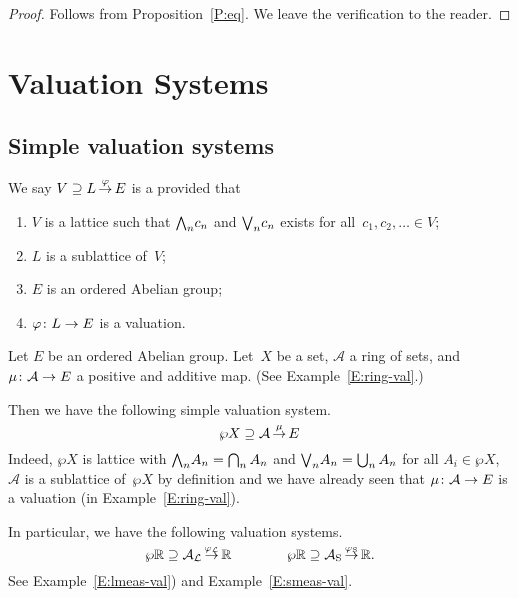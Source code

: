 \documentclass[main.tex]{subfiles}
\begin{document}
\begin{proof}
Follows from Proposition~\ref{P:eq}.
We leave the verification to the reader.
\end{proof}

\section{Valuation Systems}
\label{S:valuation-systems}
\subsection{Simple valuation systems}
%
%
\begin{dfn}
\label{D:simple-system}
We say $V \supseteq L\,\smash{\stackrel{\varphi}{\rightarrow}}\,E$
 is a 
provided that
\begin{enumerate}
\item \label{D:simple-system-1}
$V$ is a lattice
such that $\textstyle{\bigwedge}_n c_n$ and $\textstyle{\bigvee}_n c_n$ exists for all~$c_1,c_2,\dotsc\in V$;
\item \label{D:simple-system-2}
$L$ is a sublattice of~$V$;
\item \label{D:simple-system-3}
$E$ is an ordered Abelian group;
\item \label{D:simple-system-4}
$\varphi\colon L\rightarrow E$ is a valuation.
\end{enumerate}
\end{dfn}

%
%
\begin{ex}
\label{E:ring-system}
Let $E$ be an ordered Abelian group.
Let~$X$ be a set, 
$\mathcal{A}$ a ring of sets,
and $\mu\colon \mathcal{A}\rightarrow E$
a positive and additive map.
(See Example~\ref{E:ring-val}.)

Then we have the following simple valuation system.
\begin{equation*}
\wp X \supseteq \mathcal{A}\,\smash{\stackrel{\mu}{\rightarrow}}\,E
\end{equation*}
Indeed, $\wp X$ is lattice with 
$\textstyle{\bigwedge}_n A_n = \bigcap_n A_n$
and $\textstyle{\bigvee}_n A_n = \bigcup_n A_n$ for all $A_i \in \wp X$,
$\mathcal{A}$ is a sublattice of~$\wp X$
by definition
and we have already seen 
that $\mu\colon \mathcal{A}\rightarrow E$ is a valuation
(in Example~\ref{E:ring-val}).

In particular,
we have the following valuation systems.
\begin{equation*}
\wp{\mathbb{R}} \supseteq \mathcal{A}_{\mathcal{L}}\,\smash{\stackrel{\varphi_{\mathcal{L}}}{\rightarrow}}\,\mathbb{R} \qquad\qquad \wp{\mathbb{R}} \supseteq \mathcal{A}_{\mathrm{S}}\,\smash{\stackrel{\varphi_{\mathrm{S}}}{\rightarrow}}\,\mathbb{R}.
\end{equation*}
See Example~\ref{E:lmeas-val}) and  Example~\ref{E:smeas-val}.
\end{ex}
\end{document}
